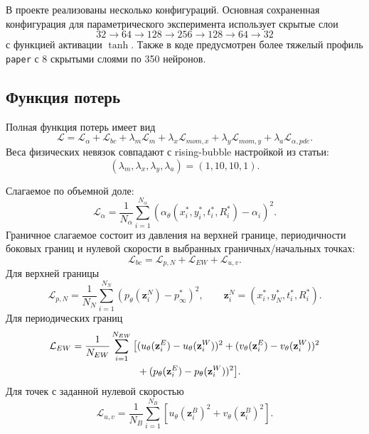 \documentclass[12pt,a4paper]{article}
\begin{document}
В проекте реализованы несколько конфигураций. Основная сохраненная конфигурация
для параметрического эксперимента использует скрытые слои
\[
    32\rightarrow64\rightarrow128\rightarrow256\rightarrow128\rightarrow64\rightarrow32
\]
с функцией активации \(\tanh\). Также в коде предусмотрен более тяжелый
профиль \texttt{paper} с 8 скрытыми слоями по 350 нейронов.

\subsection{Функция потерь}

Полная функция потерь имеет вид
\begin{equation}
    \mathcal{L}
    =
    \mathcal{L}_\alpha
    +
    \mathcal{L}_{bc}
    +
    \lambda_m\mathcal{L}_m
    +
    \lambda_x\mathcal{L}_{mom,x}
    +
    \lambda_y\mathcal{L}_{mom,y}
    +
    \lambda_a\mathcal{L}_{\alpha,pde}.
    \label{eq:loss_total}
\end{equation}
Веса физических невязок совпадают с rising-bubble настройкой из статьи:
\[
    (\lambda_m,\lambda_x,\lambda_y,\lambda_a)=(1,10,10,1).
\]

Слагаемое по объемной доле:
\begin{equation}
    \mathcal{L}_\alpha
    =
    \frac{1}{N_\alpha}
    \sum_{i=1}^{N_\alpha}
    \left(
        \alpha_\theta(x_i^*,y_i^*,t_i^*,R_i^*)-\alpha_i
    \right)^2.
\end{equation}
Граничное слагаемое состоит из давления на верхней границе, периодичности
боковых границ и нулевой скорости в выбранных граничных/начальных точках:
\begin{equation}
    \mathcal{L}_{bc}
    =
    \mathcal{L}_{p,N}
    +
    \mathcal{L}_{EW}
    +
    \mathcal{L}_{u,v}.
\end{equation}
Для верхней границы
\begin{equation}
    \mathcal{L}_{p,N}
    =
    \frac{1}{N_N}
    \sum_{i=1}^{N_N}
    \left(p_\theta(\mathbf{z}_i^N)-p_\infty^*\right)^2,
    \qquad
    \mathbf{z}_i^N=(x_i^*,y_N^*,t_i^*,R_i^*).
\end{equation}
Для периодических границ
\begin{align}
    \mathcal{L}_{EW}
    =
    \frac{1}{N_{EW}}
    \sum_{i=1}^{N_{EW}}
    \big[
        &(u_\theta(\mathbf{z}_i^E)-u_\theta(\mathbf{z}_i^W))^2
        +(v_\theta(\mathbf{z}_i^E)-v_\theta(\mathbf{z}_i^W))^2
        \notag\\
        &+(p_\theta(\mathbf{z}_i^E)-p_\theta(\mathbf{z}_i^W))^2
    \big].
\end{align}
Для точек с заданной нулевой скоростью
\begin{equation}
    \mathcal{L}_{u,v}
    =
    \frac{1}{N_B}
    \sum_{i=1}^{N_B}
    \left[
        u_\theta(\mathbf{z}_i^B)^2
        +
        v_\theta(\mathbf{z}_i^B)^2
    \right].
\end{equation}
\end{document}
